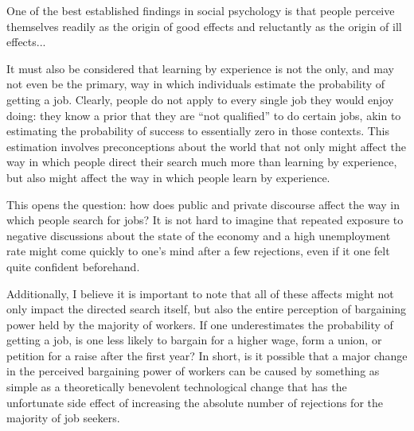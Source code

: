 \documentclass[a4paper,12pt]{article}
\begin{document}
\begin{displayquote}
One of the best established findings in social psychology is that people perceive themselves readily as the origin of good effects and reluctantly as the origin of ill effects...
\end{displayquote}

It must also be considered that learning by experience is not the only, and may not even be the primary, way in which individuals estimate the probability of getting a job. Clearly, people do not apply to every single job they would enjoy doing: they know a prior that they are ``not qualified'' to do certain jobs, akin to estimating the probability of success to essentially zero in those contexts. This estimation involves preconceptions about the world that not only might affect the way in which people direct their search much more than learning by experience, but also might affect the way in which people learn by experience.

This opens the question: how does public and private discourse affect the way in which people search for jobs? It is not hard to imagine that repeated exposure to negative discussions about the state of the economy and a high unemployment rate might come quickly to one's mind after a few rejections, even if it one felt quite confident beforehand.

Additionally, I believe it is important to note that all of these affects might not only impact the directed search itself, but also the entire perception of bargaining power held by the majority of workers. If one underestimates the probability of getting a job, is one less likely to bargain for a higher wage, form a union, or petition for a raise after the first year? In short, is it possible that a major change in the perceived bargaining power of workers can be caused by something as simple as a theoretically benevolent technological change that has the unfortunate side effect of increasing the absolute number of rejections for the majority of job seekers.


\printbibliography

\newpage
\end{document}
